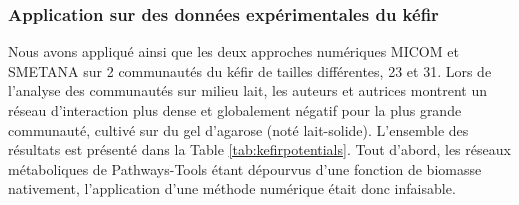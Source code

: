 \documentclass[../main.tex]{subfiles}
\begin{document}
\subsubsection*{Application sur des données expérimentales du kéfir}
Nous avons appliqué \ccmc ainsi que les deux approches numériques MICOM et SMETANA sur 2 communautés du kéfir de tailles différentes, 23 et 31. Lors de l'analyse des communautés sur milieu lait, les auteurs et autrices montrent un réseau d'interaction plus dense et globalement négatif pour la plus grande communauté, cultivé sur du gel d'agarose (noté lait-solide). L'ensemble des résultats est présenté dans la Table \ref{tab:kefirpotentials}. Tout d'abord, les réseaux métaboliques de Pathways-Tools étant dépourvus d'une fonction de biomasse nativement, l'application d'une méthode numérique était donc infaisable. 
\end{document}
